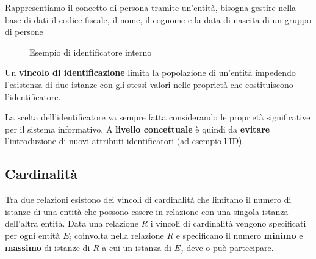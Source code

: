 \documentclass[a4paper]{article}
\begin{document}
\begin{example}
  Rappresentiamo il concetto di persona tramite un'entità, bisogna gestire nella base
  di dati il codice fiscale, il nome, il cognome e la data di nascita di un gruppo
  di persone
  \begin{figure}[H]
    \centering
    \caption{Esempio di identificatore interno}
  \end{figure}
\end{example}

\begin{definition}
  Un \textbf{vincolo di identificazione} limita la popolazione di un'entità impedendo
  l'esistenza di due istanze con gli stessi valori nelle proprietà che costituiscono
  l'identificatore.

  \vspace{1em}
  \noindent
  La scelta dell'identificatore va sempre fatta considerando le proprietà significative
  per il sistema informativo. A \textbf{livello concettuale} è quindi da \textbf{evitare}
  l'introduzione di nuovi attributi identificatori (ad esempio l'ID).
\end{definition}

\subsection{Cardinalità}\label{Cardinalità}
Tra due relazioni esistono dei vincoli di cardinalità che limitano il numero di istanze
di una entità che possono essere in relazione con una singola istanza dell'altra entità.
Data una relazione \( R \) i vincoli di cardinalità vengono specificati per ogni entità
\( E_i \) coinvolta nella relazione \( R \) e specificano il numero \textbf{minimo} e
\textbf{massimo} di istanze di \( R \) a cui un istanza di \( E_j \) deve o può 
partecipare.
\end{document}
